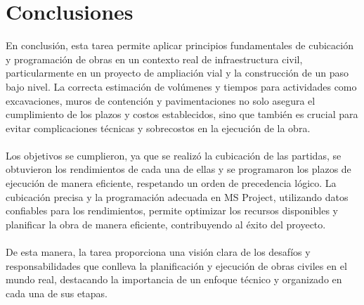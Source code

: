 \section{Conclusiones}

En conclusión, esta tarea permite aplicar principios fundamentales de cubicación y programación de obras en un contexto real de infraestructura civil, particularmente en un proyecto de ampliación vial y la construcción de un paso bajo nivel. La correcta estimación de volúmenes y tiempos para actividades como excavaciones, muros de contención y pavimentaciones no solo asegura el cumplimiento de los plazos y costos establecidos, sino que también es crucial para evitar complicaciones técnicas y sobrecostos en la ejecución de la obra.
\\\\
Los objetivos se cumplieron, ya que se realizó la cubicación de las partidas, se obtuvieron los rendimientos de cada una de ellas y se programaron los plazos de ejecución de manera eficiente, respetando un orden de precedencia lógico. La cubicación precisa y la programación adecuada en MS Project, utilizando datos confiables para los rendimientos, permite optimizar los recursos disponibles y planificar la obra de manera eficiente, contribuyendo al éxito del proyecto.
\\\\
De esta manera, la tarea proporciona una visión clara de los desafíos y responsabilidades que conlleva la planificación y ejecución de obras civiles en el mundo real, destacando la importancia de un enfoque técnico y organizado en cada una de sus etapas.